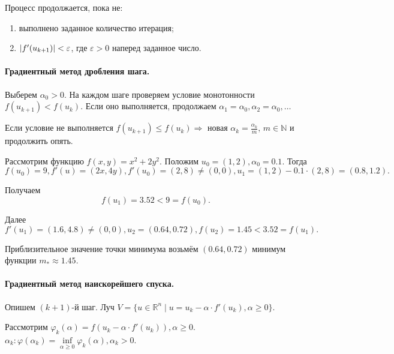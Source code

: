 Процесс продолжается, пока не:
\begin{enumerate}
	\item выполнено заданное количество итерация;
	
	\item $\abs{f'(u_{k + 1})} < \varepsilon$, где $\varepsilon > 0$ наперед заданное число.
\end{enumerate}

\paragraph{Градиентный метод дробления шага. } Выберем $\alpha_0 > 0$. На каждом шаге проверяем условие монотонности $f(u_{k + 1}) < f(u_k)$. Если оно выполняется, продолжаем $\alpha_1 = \alpha_0, \alpha_2 = \alpha_0, \dotsc$

Если условие не выполняется $f(u_{k + 1}) \leqslant f(u_k) \Rightarrow$ новая $\alpha_k = \frac{\alpha_k}{m}, \, m \in \mathbb{N}$ и продолжить опять.

\begin{example}
	Рассмотрим функцию $f(x, y) = x^2 + 2 y^2$. Положим $u_0 = (1, 2), \alpha_0 = 0.1$. Тогда
	\begin{equation*}
		f(u_0) = 9, f'(u) = (2 x, 4 y), f'(u_0) = (2, 8) \not = (0, 0), u_1 = (1, 2) - 0.1 \cdot (2, 8) = (0.8, 1.2).
	\end{equation*}
	
	Получаем
	\begin{equation*}
		f(u_1) = 3.52 < 9 = f(u_0).
	\end{equation*}
	
	Далее 
	\begin{equation*}
		f'(u_1) = (1.6, 4.8) \not = (0, 0), u_2 = (0.64, 0.72), f(u_2) = 1.45 < 3.52 = f(u_1).
	\end{equation*}
	
	Приблизительное значение точки минимума возьмём $(0.64, 0.72)$ минимум функции $m_{\ast} \approx 1.45$.
\end{example}

\paragraph{Градиентный метод наискорейшего спуска. } Опишем $(k + 1)$-й шаг. Луч $V = \{u \in \mathbb{R}^n \mid u = u_{k} - \alpha \cdot f'(u_k), \alpha \geqslant 0\}$. 

Рассмотрим $\varphi_k(\alpha) = f(u_k - \alpha \cdot f'(u_k)), \alpha \geqslant 0$. $\alpha_k: \varphi(\alpha_k) = \inf\limits_{\alpha \geqslant 0}{\varphi_k(\alpha)}, \alpha_k > 0$.

